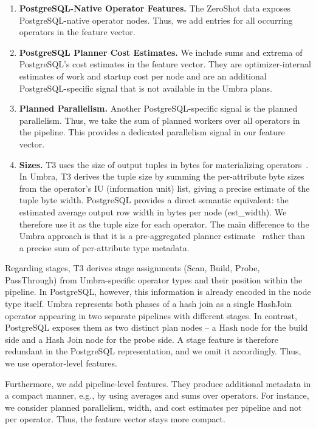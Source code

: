 \begin{enumerate}
  \item \textbf{PostgreSQL-Native Operator Features.} The ZeroShot data exposes PostgreSQL-native operator nodes. 
  Thus, we add entries for all occurring operators in the feature vector.
  
  
  \item \textbf{PostgreSQL Planner Cost Estimates.} We include sums and extrema of PostgreSQL's cost estimates in the feature vector.
  They are optimizer-internal estimates of work and startup cost per node and are an additional PostgreSQL-specific signal that is not available in the Umbra plans.
  \item \textbf{Planned Parallelism.} Another PostgreSQL-specific signal is the planned parallelism. Thus, we take the sum of planned workers over all operators in the pipeline.
  This provides a dedicated parallelism signal in our feature vector.
  \item \textbf{Sizes.} T3 uses the size of output tuples in bytes for materializing operators~\parencite{t3}.
  In Umbra, T3 derives the tuple size by summing the per-attribute byte sizes from the operator's IU (information unit) list,
  giving a precise estimate of the tuple byte width.
  PostgreSQL provides a direct semantic equivalent: the estimated average output row width in bytes per node (est\_width).
  We therefore use it as the tuple size for each operator.
  The main difference to the Umbra approach is that it is a pre-aggregated planner estimate~\parencite{postgresql_docs_explain}
  rather than a precise sum of per-attribute type metadata.
\end{enumerate}

Regarding stages, T3 derives stage assignments (Scan, Build, Probe, PassThrough) from Umbra-specific operator types and their position within the pipeline.
In PostgreSQL, however, this information is already encoded in the node type itself.
Umbra represents both phases of a hash join as a single HashJoin operator appearing in two separate pipelines with different stages.
In contrast, PostgreSQL exposes them as two distinct plan nodes -- a Hash node for the build side and a Hash Join node for the probe side.
A stage feature is therefore redundant in the PostgreSQL representation, and we omit it accordingly.
Thus, we use operator-level features.

Furthermore, we add pipeline-level features.
They produce additional metadata in a compact manner, e.g., by using averages and sums over operators.
For instance, we consider planned parallelism, width, and cost estimates per pipeline and not per operator.
Thus, the feature vector stays more compact.

